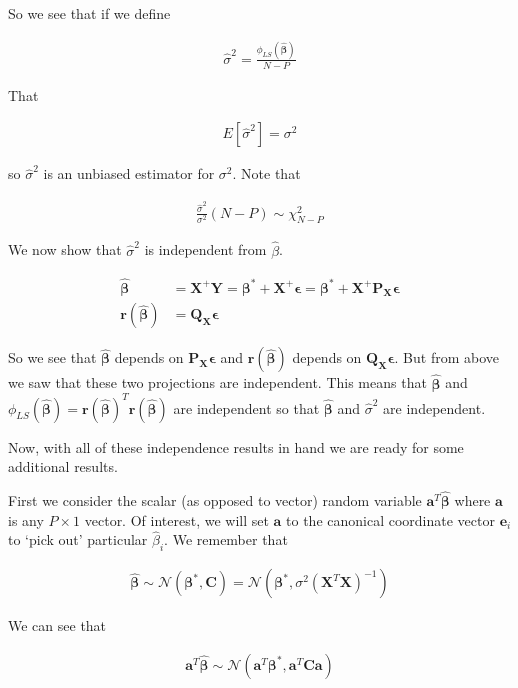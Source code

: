 \documentclass[12pt]{article}
\newcommand{\ep}{\epsilon}
\newcommand{\bv}[1]{\boldsymbol{#1}}
\begin{document}
So we see that if we define

\begin{align}
\hat{\sigma}^2 = \frac{\phi_{LS}(\bv{\hat{\beta}})}{N-P}
\end{align}

That

\begin{align}
E[\hat{\sigma}^2] = \sigma^2
\end{align}

so $\hat{\sigma}^2$ is an unbiased estimator for $\sigma^2$.
Note that

\begin{align}
\frac{\hat{\sigma}^2}{\sigma^2} (N-P) \sim \chi^2_{N-P}
\end{align}

We now show that $\hat{\sigma}^2$ is independent from $\hat{\beta}$. 

\begin{align}
\bv{\hat{\beta}} &= \bv{X}^+\bv{Y} = \bv{\beta^*} + \bv{X}^+\bv{\ep} = \bv{\beta^*} + \bv{X}^+\bv{P_X}\bv{\ep}\\
\bv{r}(\bv{\hat{\beta}}) &= \bv{Q_X}\bv{\ep}
\end{align}

So we see that $\bv{\hat{\beta}}$ depends on $\bv{P_X}\bv{\ep}$ and $\bv{r}(\bv{\hat{\beta}})$ depends on $\bv{Q_X}\bv{\ep}$. 
But from above we saw that these two projections are independent.
This means that $\bv{\hat{\beta}}$ and $\phi_{LS}(\bv{\hat{\beta}}) = \bv{r}(\bv{\hat{\beta}})^T\bv{r}(\bv{\hat{\beta}})$ are independent so that $\bv{\hat{\beta}}$ and $\hat{\sigma}^2$ are independent.

Now, with all of these independence results in hand we are ready for some additional results.

First we consider the scalar (as opposed to vector) random variable $\bv{a}^T \bv{\hat{\beta}}$ where $\bv{a}$ is any $P\times 1$ vector.
Of interest, we will set $\bv{a}$ to the canonical coordinate vector $\bv{e}_i$ to `pick out' particular $\hat{\beta}_i$.
We remember that

\begin{align}
\bv{\hat{\beta}} \sim \mathcal{N}(\bv{\beta^*}, \bv{C}) = \mathcal{N}(\bv{\beta^*}, \sigma^2(\bv{X}^T\bv{X})^{-1})
\end{align}

We can see that

\begin{align}
\bv{a}^T\bv{\hat{\beta}} \sim \mathcal{N}(\bv{a}^T\bv{\beta^*}, \bv{a}^T\bv{C}\bv{a})
\end{align}
\end{document}
